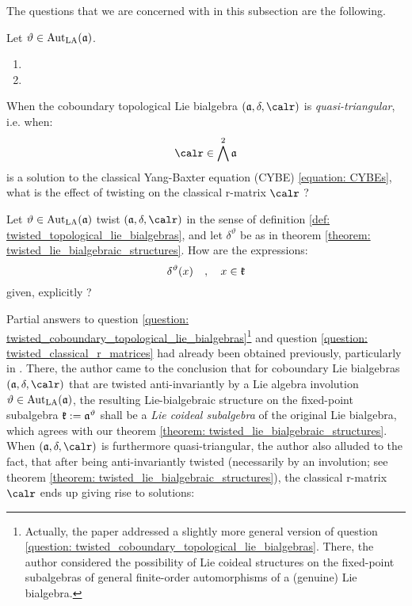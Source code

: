         The questions that we are concerned with in this subsection are the following.
        \begin{question} \label{question: twisted_coboundary_topological_lie_bialgebras}
            Let $\vartheta \in \operatorname{Aut}_{\mathrm{LA}}(\mathfrak{a})$.
            \begin{enumerate}
                \item 
                \item 
            \end{enumerate}
        \end{question}
        \begin{question} \label{question: twisted_classical_r_matrices}
            When the coboundary topological Lie bialgebra $(\a, \delta, \calr)$ is \textit{quasi-triangular}, i.e. when:
                $$\calr \in \bigwedge^2 \a$$
            is a solution to the classical Yang-Baxter equation (CYBE) \eqref{equation: CYBEs}, what is the effect of twisting on the classical r-matrix $\calr$ ?
        \end{question}
        \begin{question} \label{question: explicit_expressions_for_twisted_cobrackets}
            Let $\vartheta \in \operatorname{Aut}_{\mathrm{LA}}(\mathfrak{a})$ twist $(\a, \delta, \calr)$ in the sense of definition \ref{def: twisted_topological_lie_bialgebras}, and let $\delta^{\vartheta}$ be as in theorem \ref{theorem: twisted_lie_bialgebraic_structures}. How are the expressions:
                $$\delta^{\vartheta}(x) \quad, \quad x \in \mathfrak{k}$$
            given, explicitly ?
        \end{question}
        Partial answers to question \ref{question: twisted_coboundary_topological_lie_bialgebras}\footnote{Actually, the paper \cite{schrader_integrable_systems_from_classical_reflection_equations} addressed a slightly more general version of question \ref{question: twisted_coboundary_topological_lie_bialgebras}. There, the author considered the possibility of Lie coideal structures on the fixed-point subalgebras of general finite-order automorphisms of a (genuine) Lie bialgebra.} and question \ref{question: twisted_classical_r_matrices} had already been obtained previously, particularly in \cite{schrader_integrable_systems_from_classical_reflection_equations}. There, the author came to the conclusion that for  coboundary Lie bialgebras $(\a, \delta, \calr)$ that are twisted anti-invariantly by a Lie algebra involution $\vartheta \in \operatorname{Aut}_{\mathrm{LA}}(\mathfrak{a})$, the resulting Lie-bialgebraic structure on the fixed-point subalgebra $\mathfrak{k} := \mathfrak{a}^{\vartheta}$ shall be a \textit{Lie coideal subalgebra} of the original Lie bialgebra, which agrees with our theorem \ref{theorem: twisted_lie_bialgebraic_structures}. When $(\a, \delta, \calr)$ is furthermore quasi-triangular, the author also alluded to the fact, that after being anti-invariantly twisted (necessarily by an involution; see theorem \ref{theorem: twisted_lie_bialgebraic_structures}), the classical r-matrix $\calr$ ends up giving rise to solutions:
